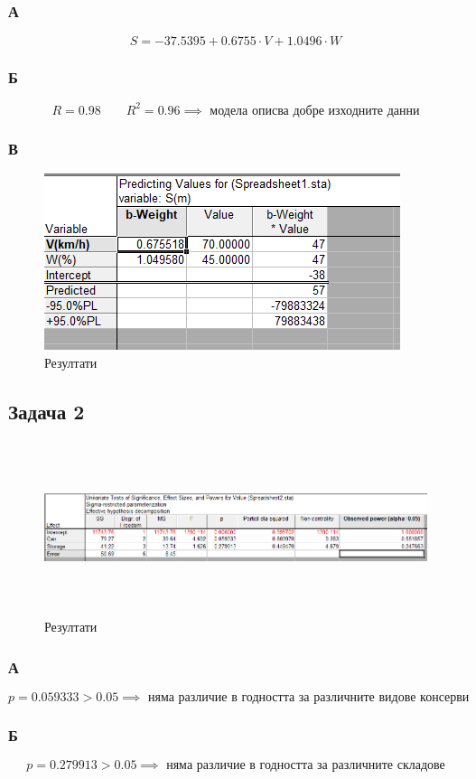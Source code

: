 \documentclass[a4paper,fleqn,12pt]{article}
\begin{document}
\subsubsection{А}
$$
S = -37.5395 + 0.6755 \cdot V + 1.0496 \cdot W
$$

\subsubsection{Б}
$$
R = 0.98 \qquad R^2 = 0.96 \implies \text{ модела описва добре изходните данни}
$$

\subsubsection{В}
\begin{figure}[h]
  \centering
  \includegraphics[width=0.96\linewidth]{task1-2.png}
  \caption{Резултати}
\end{figure}

\newpage
\subsection{Задача 2}
\begin{figure}[h]
  \centering
  \includegraphics[width=1.2\linewidth,height= 2in]{task2.png}
  \caption{Резултати}
\end{figure}

\subsubsection{А}
$$
p=0.059333 > 0.05 \implies \text{ няма различие в годността за различните видове консерви}
$$

\subsubsection{Б}
$$
p=0.279913 > 0.05 \implies \text{ няма различие в годността за различните складове}
$$
\end{document}
